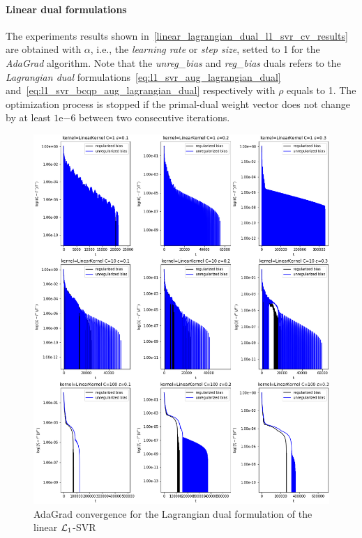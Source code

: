 \pagebreak

\paragraph{Linear dual formulations}

The experiments results shown in~\ref{linear_lagrangian_dual_l1_svr_cv_results} are obtained with $\alpha$, i.e., the \emph{learning rate} or \emph{step size}, setted to 1 for the \emph{AdaGrad} algorithm. Note that the \emph{unreg\_bias} and \emph{reg\_bias} duals refers to the \emph{Lagrangian dual} formulations~\eqref{eq:l1_svr_aug_lagrangian_dual} and~\eqref{eq:l1_svr_bcqp_aug_lagrangian_dual} respectively with $\rho$ equals to 1. The optimization process is stopped if the primal-dual weight vector does not change by at least $1\mathrm{e}{-6}$  between two consecutive iterations.





\begin{figure}[H]
	\centering
	\includegraphics[scale=0.55]{img/linear_lagrangian_dual_l1_svr_loss_history}
	\caption{AdaGrad convergence for the Lagrangian dual formulation of the linear $\protect \mathcal{L}_1$-SVR}
	\label{fig:linear_lagrangian_dual_l1_svr_loss_history}
\end{figure}

